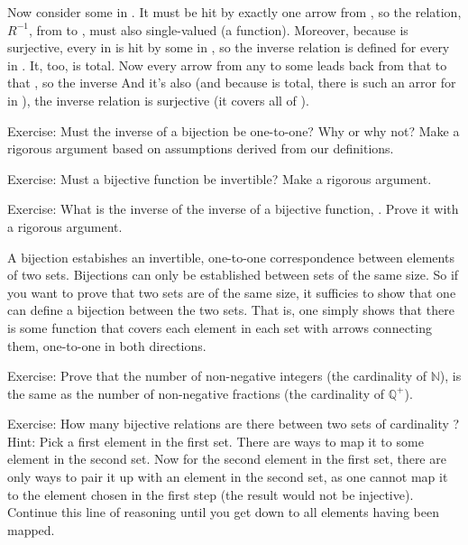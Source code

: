 \documentclass[letterpaper,10pt,english]{sphinxmanual}
\begin{document}
Now consider some  in . It must be hit by exactly one arrow from
, so the  relation, \(R^{-1}\), from  to , must
also single-valued (a function). Moreover, because  is surjective,
every  in  is hit by some  in , so the inverse relation is
defined for every  in . It, too, is total. Now every arrow from
any  to some  leads back from that  to that , so the
inverse And it’s also (and because  is total, there is such an
arror for   in ), the inverse relation is surjective (it
covers all of ).

Exercise: Must the inverse of a bijection be one-to-one? Why or why
not?  Make a rigorous argument based on assumptions derived from our
definitions.

Exercise: Must a bijective function be invertible? Make a rigorous
argument.

Exercise: What is the inverse of the inverse of a bijective function,
. Prove it with a rigorous argument.

A bijection estabishes an invertible, one-to-one correspondence
between elements of two sets. Bijections can only be established
between sets of the same size. So if you want to prove that two sets
are of the same size, it sufficies to show that one can define a
bijection between the two sets. That is, one simply shows that there
is some function that covers each element in each set with arrows
connecting them, one-to-one in both directions.

Exercise: Prove that the number of non-negative integers (the
cardinality of \({\mathbb N}\)), is the same as the number of
non-negative fractions (the cardinality of \({\mathbb Q^{+}}\)).

Exercise: How many bijective relations are there between two sets of
cardinality ? Hint: Pick a first element in the first set. There
are  ways to map it to some element in the second set. Now for the
second element in the first set, there are only  ways to pair
it up with an element in the second set, as one cannot map it to the
element chosen in the first step (the result would not be injective).
Continue this line of reasoning until you get down to all elements
having been mapped.
\end{document}
